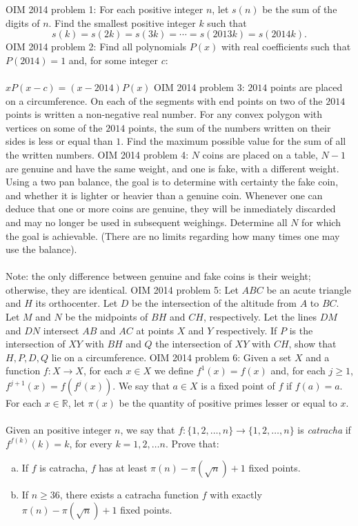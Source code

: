OIM 2014 problem 1:  For each positive integer $n$, let $s(n)$ be the sum of the digits of $n$. Find the smallest positive integer $k$ such that
\[ s(k) = s(2k) = s(3k) = \cdots = s(2013k) = s(2014k). \] 
OIM 2014 problem 2:  Find all polynomials $P(x)$ with real coefficients such that $P(2014) = 1$ and, for some integer $c$: \\\\
$xP(x-c) = (x - 2014)P(x)$ 
OIM 2014 problem 3:  $2014$ points are placed on a circumference. On each of the segments with end points on two of the $2014$ points is written a non-negative real number. For any convex polygon with vertices on some of the $2014$ points, the sum of the numbers written on their sides is less or equal than $1$. Find the maximum possible value for the sum of all the written numbers. 
OIM 2014 problem 4:  $N$ coins are placed on a table, $N - 1$ are genuine and have the same weight, and one is fake, with a different weight. Using a two pan balance, the goal is to determine with certainty the fake coin, and whether it is lighter or heavier than a genuine coin. Whenever one can deduce that one or more coins are genuine, they will be inmediately discarded and may no longer be used in subsequent weighings. Determine all $N$ for which the goal is achievable. (There are no limits regarding how many times one may use the balance). \\\\
Note: the only difference between genuine and fake coins is their weight; otherwise, they are identical. 
OIM 2014 problem 5:  Let $ABC$ be an acute triangle and $H$ its orthocenter. Let $D$ be the intersection of the altitude from $A$ to $BC$. Let $M$ and $N$ be the midpoints of $BH$ and $CH$, respectively. Let the lines $DM$ and $DN$ intersect $AB$ and $AC$ at points $X$ and $Y$ respectively. If $P$ is the intersection of $XY$ with $BH$ and $Q$ the intersection of $XY$ with $CH$, show that $H, P, D, Q$ lie on a circumference. 
OIM 2014 problem 6:  Given a set $X$ and a function $f: X \rightarrow X$, for each $x \in X$ we define $f^1(x)=f(x)$ and, for each $j \ge 1$, $f^{j+1}(x)=f(f^j(x))$. We say that $a \in X$ is a fixed point of $f$ if $f(a)=a$. For each $x \in \mathbb{R}$, let $\pi (x)$ be the quantity of positive primes lesser or equal to $x$. \\\\
Given an positive integer $n$, we say that $f: \{1,2, \dots, n\} \rightarrow \{1,2, \dots, n\}$ is \textit{catracha} if $f^{f(k)}(k)=k$, for every $k=1, 2, \dots n$. Prove that:
\begin{enumerate}[(a)]
  \item If $f$ is catracha, $f$ has at least $\pi (n) -\pi (\sqrt{n}) +1$ fixed points.
  \item If $n \ge 36$, there exists a catracha function $f$ with exactly $ \pi (n) -\pi (\sqrt{n}) + 1$ fixed points.
\end{enumerate} 

